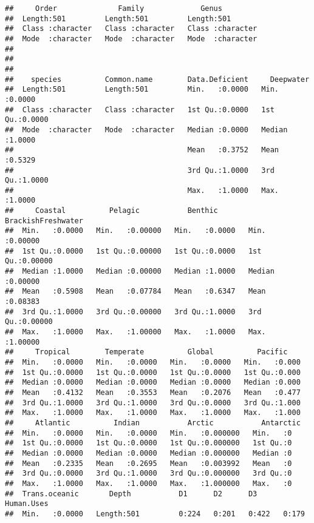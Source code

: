 \documentclass[]{article}
\begin{document}
\begin{verbatim}
##     Order              Family             Genus          
##  Length:501         Length:501         Length:501        
##  Class :character   Class :character   Class :character  
##  Mode  :character   Mode  :character   Mode  :character  
##                                                          
##                                                          
##                                                          
##    species          Common.name        Data.Deficient     Deepwater     
##  Length:501         Length:501         Min.   :0.0000   Min.   :0.0000  
##  Class :character   Class :character   1st Qu.:0.0000   1st Qu.:0.0000  
##  Mode  :character   Mode  :character   Median :0.0000   Median :1.0000  
##                                        Mean   :0.3752   Mean   :0.5329  
##                                        3rd Qu.:1.0000   3rd Qu.:1.0000  
##                                        Max.   :1.0000   Max.   :1.0000  
##     Coastal          Pelagic           Benthic       BrackishFreshwater
##  Min.   :0.0000   Min.   :0.00000   Min.   :0.0000   Min.   :0.00000   
##  1st Qu.:0.0000   1st Qu.:0.00000   1st Qu.:0.0000   1st Qu.:0.00000   
##  Median :1.0000   Median :0.00000   Median :1.0000   Median :0.00000   
##  Mean   :0.5908   Mean   :0.07784   Mean   :0.6347   Mean   :0.08383   
##  3rd Qu.:1.0000   3rd Qu.:0.00000   3rd Qu.:1.0000   3rd Qu.:0.00000   
##  Max.   :1.0000   Max.   :1.00000   Max.   :1.0000   Max.   :1.00000   
##     Tropical        Temperate          Global          Pacific     
##  Min.   :0.0000   Min.   :0.0000   Min.   :0.0000   Min.   :0.000  
##  1st Qu.:0.0000   1st Qu.:0.0000   1st Qu.:0.0000   1st Qu.:0.000  
##  Median :0.0000   Median :0.0000   Median :0.0000   Median :0.000  
##  Mean   :0.4132   Mean   :0.3553   Mean   :0.2076   Mean   :0.477  
##  3rd Qu.:1.0000   3rd Qu.:1.0000   3rd Qu.:0.0000   3rd Qu.:1.000  
##  Max.   :1.0000   Max.   :1.0000   Max.   :1.0000   Max.   :1.000  
##     Atlantic          Indian           Arctic           Antarctic
##  Min.   :0.0000   Min.   :0.0000   Min.   :0.000000   Min.   :0  
##  1st Qu.:0.0000   1st Qu.:0.0000   1st Qu.:0.000000   1st Qu.:0  
##  Median :0.0000   Median :0.0000   Median :0.000000   Median :0  
##  Mean   :0.2335   Mean   :0.2695   Mean   :0.003992   Mean   :0  
##  3rd Qu.:0.0000   3rd Qu.:1.0000   3rd Qu.:0.000000   3rd Qu.:0  
##  Max.   :1.0000   Max.   :1.0000   Max.   :1.000000   Max.   :0  
##  Trans.oceanic       Depth           D1      D2      D3      Human.Uses
##  Min.   :0.0000   Length:501         0:224   0:201   0:422   0:179     

\end{verbatim}
\end{document}
